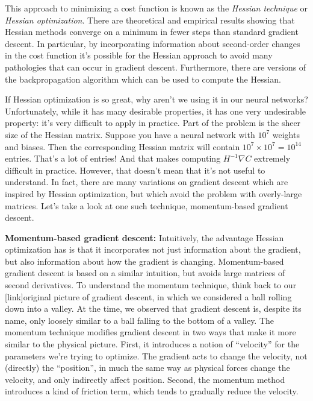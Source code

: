 \documentclass[a4paper,twoside,10pt]{book}
\begin{document}
This approach to minimizing a cost function is known as the \textit{Hessian technique} or \textit{Hessian optimization}. There are theoretical and empirical results showing that Hessian methods converge on a minimum in fewer steps than standard gradient descent. In particular, by incorporating information about second-order changes in the cost function it's possible for the Hessian approach to avoid many pathologies that can occur in gradient descent. Furthermore, there are versions of the backpropagation algorithm which can be used to compute the Hessian.

If Hessian optimization is so great, why aren't we using it in our neural networks? Unfortunately, while it has many desirable properties, it has one very undesirable property: it's very difficult to apply in practice. Part of the problem is the sheer size of the Hessian matrix. Suppose you have a neural network with $10^7$ weights and biases. Then the corresponding Hessian matrix will contain $10^7\times10^7=10^{14}$ entries. That's a lot of entries! And that makes computing $H^{-1} \nabla C$ extremely difficult in practice. However, that doesn't mean that it's not useful to understand. In fact, there are many variations on gradient descent which are inspired by Hessian optimization, but which avoid the problem with overly-large matrices. Let's take a look at one such technique, momentum-based gradient descent.


\textbf{Momentum-based gradient descent:} Intuitively, the advantage Hessian optimization has is that it incorporates not just information about the gradient, but also information about how the gradient is changing. Momentum-based gradient descent is based on a similar intuition, but avoids large matrices of second derivatives. To understand the momentum technique, think back to our [link]original picture of gradient descent, in which we considered a ball rolling down into a valley. At the time, we observed that gradient descent is, despite its name, only loosely similar to a ball falling to the bottom of a valley. The momentum technique modifies gradient descent in two ways that make it more similar to the physical picture. First, it introduces a notion of ``velocity'' for the parameters we're trying to optimize. The gradient acts to change the velocity, not (directly) the ``position'', in much the same way as physical forces change the velocity, and only indirectly affect position. Second, the momentum method introduces a kind of friction term, which tends to gradually reduce the velocity.
\end{document}
